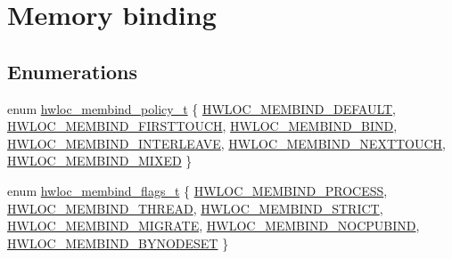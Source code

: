 \hypertarget{a00191}{}\section{Memory binding}
\label{a00191}
\subsection*{Enumerations}
\begin{DoxyCompactItemize}
\item 
enum \hyperlink{a00191_gac9764f79505775d06407b40f5e4661e8}{hwloc\+\_\+membind\+\_\+policy\+\_\+t} \{ \newline
\hyperlink{a00191_ggac9764f79505775d06407b40f5e4661e8a18675bb80ebc1bce5b652e9de8f3998c}{H\+W\+L\+O\+C\+\_\+\+M\+E\+M\+B\+I\+N\+D\+\_\+\+D\+E\+F\+A\+U\+LT}, 
\hyperlink{a00191_ggac9764f79505775d06407b40f5e4661e8a979c7aa78dd32780858f30f47a72cca0}{H\+W\+L\+O\+C\+\_\+\+M\+E\+M\+B\+I\+N\+D\+\_\+\+F\+I\+R\+S\+T\+T\+O\+U\+CH}, 
\hyperlink{a00191_ggac9764f79505775d06407b40f5e4661e8ad811fa4b2a6002c4d63695a408ffde2c}{H\+W\+L\+O\+C\+\_\+\+M\+E\+M\+B\+I\+N\+D\+\_\+\+B\+I\+ND}, 
\hyperlink{a00191_ggac9764f79505775d06407b40f5e4661e8ae370075e5af016d42310f87ea5af236b}{H\+W\+L\+O\+C\+\_\+\+M\+E\+M\+B\+I\+N\+D\+\_\+\+I\+N\+T\+E\+R\+L\+E\+A\+VE}, 
\newline
\hyperlink{a00191_ggac9764f79505775d06407b40f5e4661e8aecdd4164d647708fbb51a00d98dbb138}{H\+W\+L\+O\+C\+\_\+\+M\+E\+M\+B\+I\+N\+D\+\_\+\+N\+E\+X\+T\+T\+O\+U\+CH}, 
\hyperlink{a00191_ggac9764f79505775d06407b40f5e4661e8a3185bd869b67817fb2bd5164bf360402}{H\+W\+L\+O\+C\+\_\+\+M\+E\+M\+B\+I\+N\+D\+\_\+\+M\+I\+X\+ED}
 \}
\item 
enum \hyperlink{a00191_gab00475fd98815bf4fb9aaf752030e7d2}{hwloc\+\_\+membind\+\_\+flags\+\_\+t} \{ \newline
\hyperlink{a00191_ggab00475fd98815bf4fb9aaf752030e7d2a1b1b74aef138f64aff214a8cbdfe8eb4}{H\+W\+L\+O\+C\+\_\+\+M\+E\+M\+B\+I\+N\+D\+\_\+\+P\+R\+O\+C\+E\+SS}, 
\hyperlink{a00191_ggab00475fd98815bf4fb9aaf752030e7d2a1dc7dd5cdcd5796893a325a524555298}{H\+W\+L\+O\+C\+\_\+\+M\+E\+M\+B\+I\+N\+D\+\_\+\+T\+H\+R\+E\+AD}, 
\hyperlink{a00191_ggab00475fd98815bf4fb9aaf752030e7d2a0335311a0ee04166df2888d52b4a42c6}{H\+W\+L\+O\+C\+\_\+\+M\+E\+M\+B\+I\+N\+D\+\_\+\+S\+T\+R\+I\+CT}, 
\hyperlink{a00191_ggab00475fd98815bf4fb9aaf752030e7d2aa6e49e54f52827cb143cc869cfd748af}{H\+W\+L\+O\+C\+\_\+\+M\+E\+M\+B\+I\+N\+D\+\_\+\+M\+I\+G\+R\+A\+TE}, 
\newline
\hyperlink{a00191_ggab00475fd98815bf4fb9aaf752030e7d2aad6b9eaf2ee324ca58dc8f58094b9997}{H\+W\+L\+O\+C\+\_\+\+M\+E\+M\+B\+I\+N\+D\+\_\+\+N\+O\+C\+P\+U\+B\+I\+ND}, 
\hyperlink{a00191_ggab00475fd98815bf4fb9aaf752030e7d2a71f19fe4505f1c083dc8e6f7bdea6256}{H\+W\+L\+O\+C\+\_\+\+M\+E\+M\+B\+I\+N\+D\+\_\+\+B\+Y\+N\+O\+D\+E\+S\+ET}
 \}
\end{DoxyCompactItemize}

